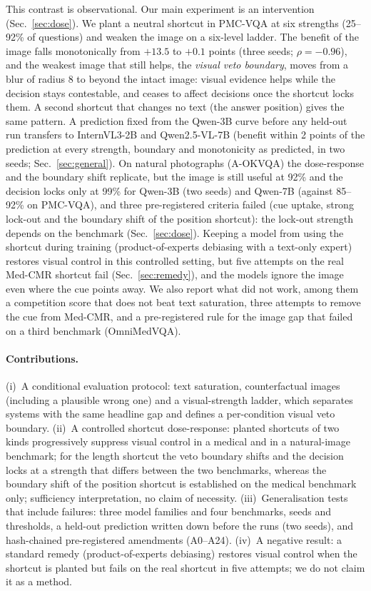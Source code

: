 This contrast is observational.
Our main experiment is an intervention (Sec.~\ref{sec:dose}).
We plant a neutral shortcut in PMC-VQA at six strengths (25--92\% of questions) and weaken the image on a six-level ladder.
The benefit of the image falls monotonically from $+13.5$ to $+0.1$ points (three seeds; $\rho=-0.96$), and the weakest image that still helps, the \emph{visual veto boundary}, moves from a blur of radius 8 to beyond the intact image: visual evidence helps while the decision stays contestable, and ceases to affect decisions once the shortcut locks them.
A second shortcut that changes no text (the answer position) gives the same pattern.
A prediction fixed from the Qwen-3B curve before any held-out run transfers to InternVL3-2B and Qwen2.5-VL-7B (benefit within 2 points of the prediction at every strength, boundary and monotonicity as predicted, in two seeds; Sec.~\ref{sec:general}).
On natural photographs (A-OKVQA) the dose-response and the boundary shift replicate, but the image is still useful at 92\% and the decision locks only at 99\% for Qwen-3B (two seeds) and Qwen-7B (against 85--92\% on PMC-VQA), and three pre-registered criteria failed (cue uptake, strong lock-out and the boundary shift of the position shortcut): the lock-out strength depends on the benchmark (Sec.~\ref{sec:dose}).
Keeping a model from using the shortcut during training (product-of-experts debiasing with a text-only expert) restores visual control in this controlled setting, but five attempts on the real Med-CMR shortcut fail (Sec.~\ref{sec:remedy}), and the models ignore the image even where the cue points away.
We also report what did not work, among them a competition score that does not beat text saturation, three attempts to remove the cue from Med-CMR, and a pre-registered rule for the image gap that failed on a third benchmark (OmniMedVQA).

\paragraph{Contributions.}
(i)~A conditional evaluation protocol: text saturation, counterfactual images (including a plausible wrong one) and a visual-strength ladder, which separates systems with the same headline gap and defines a per-condition visual veto boundary.
(ii)~A controlled shortcut dose-response: planted shortcuts of two kinds progressively suppress visual control in a medical and in a natural-image benchmark; for the length shortcut the veto boundary shifts and the decision locks at a strength that differs between the two benchmarks, whereas the boundary shift of the position shortcut is established on the medical benchmark only; sufficiency interpretation, no claim of necessity.
(iii)~Generalisation tests that include failures: three model families and four benchmarks, seeds and thresholds, a held-out prediction written down before the runs (two seeds), and hash-chained pre-registered amendments (A0--A24).
(iv)~A negative result: a standard remedy (product-of-experts debiasing) restores visual control when the shortcut is planted but fails on the real shortcut in five attempts; we do not claim it as a method.

